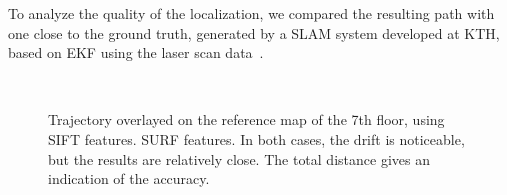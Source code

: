 \clearpage
To analyze the quality of the localization, we compared the resulting path with one close to the ground truth, generated by a \gls{SLAM} system developed at KTH, based on \gls{EKF} using the laser scan data~\cite{Folkesson_07}.
\begin{figure}[H]
\centering
{} \\
\caption{Trajectory overlayed on the reference map of the 7th floor, using \protect{} SIFT features. \protect{} SURF features. In both cases, the drift is noticeable, but the results are relatively close. The total distance gives an indication of the accuracy.}
\label{fig:plan_cvap}
\end{figure}

